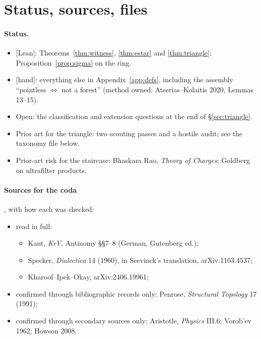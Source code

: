 \documentclass[11pt]{article}
\theoremstyle{plain}
\theoremstyle{definition}
\newcommand{\st}[1]{\textsf{\small[#1]}}
\begin{document}
\section{Status, sources, files}\label{app:status}

\paragraph{Status.}
\begin{itemize}[nosep]
  \item \st{Lean}: Theorems~\ref{thm:witness}, \ref{thm:estar} and
    \ref{thm:triangle}; Proposition~\ref{prop:sigma} on the ring.
  \item \st{hand}: everything else in Appendix~\ref{app:defs}, including the
    assembly ``pointless $\iff$ not a forest'' (method owned: Atserias--Kolaitis
    2020, Lemmas 13--15).
  \item Open: the classification and extension questions at the end of
    \S\ref{sec:triangle}.
  \item Prior art for the triangle: two scouting passes and a hostile audit;
    see the taxonomy file below.
  \item Prior-art risk for the staircase: Bhaskara Rao, \emph{Theory of
    Charges}; Goldberg on ultrafilter products.
\end{itemize}

\paragraph{Sources for the coda}, with how each was checked:
\begin{itemize}[nosep]
  \item read in full:
    \begin{itemize}[nosep]
      \item Kant, \emph{KrV}, Antinomy \S\S7--8 (German, Gutenberg ed.);
      \item Specker, \emph{Dialectica} 14 (1960), in Seevinck's translation,
        arXiv:1103.4537;
      \item Kharoof--Ipek--Okay, arXiv:2406.19961;
    \end{itemize}
  \item confirmed through bibliographic records only: Penrose, \emph{Structural
    Topology} 17 (1991);
  \item confirmed through secondary sources only: Aristotle, \emph{Physics}
    III.6; Vorob'ev 1962; Howson 2008.
\end{itemize}
\end{document}
